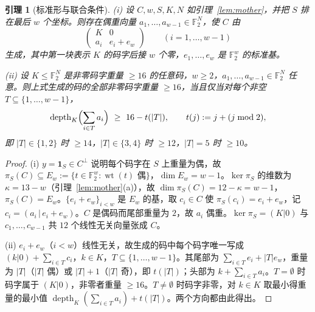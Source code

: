 \documentclass[11pt]{ctexart}
\newtheorem{lemma}{引理}
\theoremstyle{definition}
\newcommand{\F}{\mathbb{F}_2}
\newcommand{\wt}{\operatorname{wt}}
\newcommand{\depth}{\operatorname{depth}}
\begin{document}
\begin{lemma}[标准形与联合条件]\label{lem:standard}
(i) 设 $C,w,S,K,N$ 如引理~\ref{lem:mother}，并把 $S$ 排在最后 $w$ 个坐标。则存在偶重向量 $a_1,\dots,a_{w-1}\in\F^N$，使 $C$ 由
\[
\begin{pmatrix} K & 0\\ a_i & e_i+e_w\end{pmatrix}\qquad(i=1,\dots,w-1)
\]
生成，其中第一块表示 $K$ 的码字后接 $w$ 个零，$e_1,\dots,e_w$ 是 $\F^w$ 的标准基。

(ii) 设 $K\le\F^N$ 是非零码字重量 $\ge16$ 的任意码，$w\ge2$，$a_1,\dots,a_{w-1}\in\F^N$ 任意。则上式生成的码的全部非零码字重量 $\ge16$，当且仅当对每个非空 $T\subseteq\{1,\dots,w-1\}$，
\[
\depth_K\Bigl(\sum_{i\in T}a_i\Bigr)\ \ge\ 16-t(|T|),\qquad t(j):=j+(j\bmod 2),
\]
即 $|T|\in\{1,2\}$ 时 $\ge14$，$|T|\in\{3,4\}$ 时 $\ge12$，$|T|=5$ 时 $\ge10$。
\end{lemma}
\begin{proof}
(i) $y=\mathbf 1_S\in C^\perp$ 说明每个码字在 $S$ 上重量为偶，故 $\pi_S(C)\subseteq E_w:=\{t\in\F^w:\wt(t)\text{ 偶}\}$，$\dim E_w=w-1$。$\ker\pi_S$ 的维数为 $\kappa=13-w$（引理~\ref{lem:mother}(a)），故 $\dim\pi_S(C)=12-\kappa=w-1$，$\pi_S(C)=E_w$。$\{e_i+e_w\}_{i<w}$ 是 $E_w$ 的基，取 $c_i\in C$ 使 $\pi_S(c_i)=e_i+e_w$，记 $c_i=(a_i\,|\,e_i+e_w)$。$C$ 是偶码而尾部重量为 $2$，故 $a_i$ 偶重。$\ker\pi_S=(K|0)$ 与 $c_1,\dots,c_{w-1}$ 共 $12$ 个线性无关向量张成 $C$。

(ii) $e_i+e_w$（$i<w$）线性无关，故生成的码中每个码字唯一写成 $(k|0)+\sum_{i\in T}c_i$，$k\in K$，$T\subseteq\{1,\dots,w-1\}$。其尾部为 $\sum_{i\in T}e_i+|T|e_w$，重量为 $|T|$（$|T|$ 偶）或 $|T|+1$（$|T|$ 奇），即 $t(|T|)$；头部为 $k+\sum_{i\in T}a_i$。$T=\emptyset$ 时码字属于 $(K|0)$，非零者重量 $\ge16$。$T\ne\emptyset$ 时码字非零，对 $k\in K$ 取最小得重量的最小值 $\depth_K(\sum_{i\in T}a_i)+t(|T|)$。两个方向都由此得出。
\end{proof}
\end{document}

